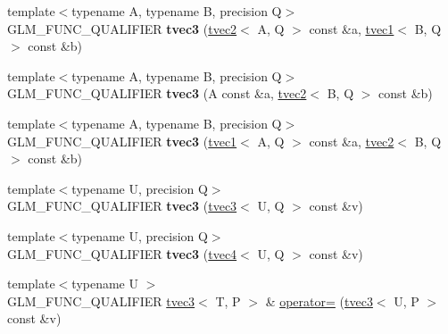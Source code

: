 \begin{DoxyCompactItemize}
\item 
\hypertarget{structglm_1_1tvec3_afc37ef1e91dd194c927e1d08449d966d}{{\footnotesize template$<$typename A, typename B, precision Q$>$ }\\G\-L\-M\-\_\-\-F\-U\-N\-C\-\_\-\-Q\-U\-A\-L\-I\-F\-I\-E\-R {\bfseries tvec3} (\hyperlink{structglm_1_1tvec2}{tvec2}$<$ A, Q $>$ const \&a, \hyperlink{structglm_1_1tvec1}{tvec1}$<$ B, Q $>$ const \&b)}\label{structglm_1_1tvec3_afc37ef1e91dd194c927e1d08449d966d}

\item 
\hypertarget{structglm_1_1tvec3_afd4819222a86a117cde864e416d751bd}{{\footnotesize template$<$typename A, typename B, precision Q$>$ }\\G\-L\-M\-\_\-\-F\-U\-N\-C\-\_\-\-Q\-U\-A\-L\-I\-F\-I\-E\-R {\bfseries tvec3} (A const \&a, \hyperlink{structglm_1_1tvec2}{tvec2}$<$ B, Q $>$ const \&b)}\label{structglm_1_1tvec3_afd4819222a86a117cde864e416d751bd}

\item 
\hypertarget{structglm_1_1tvec3_a7ac83bad0871e4c23e2da88d306ce52e}{{\footnotesize template$<$typename A, typename B, precision Q$>$ }\\G\-L\-M\-\_\-\-F\-U\-N\-C\-\_\-\-Q\-U\-A\-L\-I\-F\-I\-E\-R {\bfseries tvec3} (\hyperlink{structglm_1_1tvec1}{tvec1}$<$ A, Q $>$ const \&a, \hyperlink{structglm_1_1tvec2}{tvec2}$<$ B, Q $>$ const \&b)}\label{structglm_1_1tvec3_a7ac83bad0871e4c23e2da88d306ce52e}

\item 
\hypertarget{structglm_1_1tvec3_ae9ff3515cfa160047d428947dadbfaa2}{{\footnotesize template$<$typename U, precision Q$>$ }\\G\-L\-M\-\_\-\-F\-U\-N\-C\-\_\-\-Q\-U\-A\-L\-I\-F\-I\-E\-R {\bfseries tvec3} (\hyperlink{structglm_1_1tvec3}{tvec3}$<$ U, Q $>$ const \&v)}\label{structglm_1_1tvec3_ae9ff3515cfa160047d428947dadbfaa2}

\item 
\hypertarget{structglm_1_1tvec3_a0a6533c3375ac38ac5cd64ea107ded3b}{{\footnotesize template$<$typename U, precision Q$>$ }\\G\-L\-M\-\_\-\-F\-U\-N\-C\-\_\-\-Q\-U\-A\-L\-I\-F\-I\-E\-R {\bfseries tvec3} (\hyperlink{structglm_1_1tvec4}{tvec4}$<$ U, Q $>$ const \&v)}\label{structglm_1_1tvec3_a0a6533c3375ac38ac5cd64ea107ded3b}

\item 
\hypertarget{structglm_1_1tvec3_a4bcbc0805df40364733e741a859a6989}{{\footnotesize template$<$typename U $>$ }\\G\-L\-M\-\_\-\-F\-U\-N\-C\-\_\-\-Q\-U\-A\-L\-I\-F\-I\-E\-R \hyperlink{structglm_1_1tvec3}{tvec3}$<$ T, P $>$ \& \hyperlink{structglm_1_1tvec3_a4bcbc0805df40364733e741a859a6989}{operator=} (\hyperlink{structglm_1_1tvec3}{tvec3}$<$ U, P $>$ const \&v)}\label{structglm_1_1tvec3_a4bcbc0805df40364733e741a859a6989}


\end{DoxyCompactItemize}
